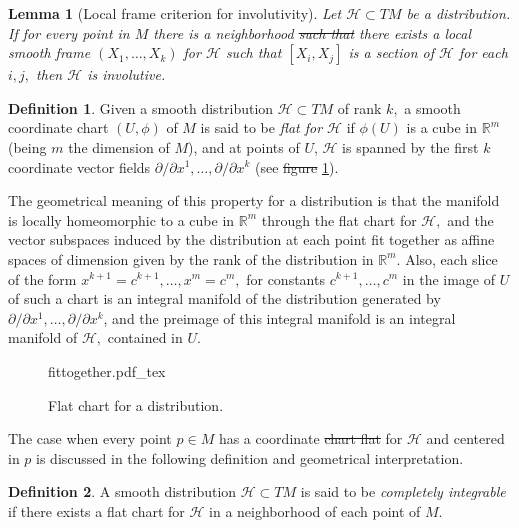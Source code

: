 \documentclass[12pt, letterpaper, reqno]{amsart}
\newcommand{\incfig}[2][1]{%
    \def\svgwidth{#1\columnwidth}
    {#2.pdf_tex}
}
\theoremstyle{definition}
\newtheorem{df}{Definition}
\theoremstyle{plain}
\newtheorem{lm}{Lemma}
\theoremstyle{remark}
\providecommand{\DIFadd}[1]{{\protect\color{blue}\uwave{#1}}} %
\providecommand{\DIFdel}[1]{{\protect\color{red}\sout{#1}}}                      %
\providecommand{\DIFaddbegin}{} %
\providecommand{\DIFaddend}{} %
\providecommand{\DIFdelbegin}{} %
\providecommand{\DIFdelend}{} %
\newcommand{\DIFscaledelfig}{0.5}
\newlength{\DIFdelgraphicswidth} %
\newlength{\DIFdelgraphicsheight} %
\newcommand{\DIFaddincludegraphics}[2][]{{\color{blue}\fbox{\DIFOincludegraphics[#1]{#2}}}} %
\newcommand{\DIFdelincludegraphics}[2][]{%
\sbox{\DIFdelgraphicsbox}{\DIFOincludegraphics[#1]{#2}}%
\settoboxwidth{\DIFdelgraphicswidth}{\DIFdelgraphicsbox} %
\settoboxtotalheight{\DIFdelgraphicsheight}{\DIFdelgraphicsbox} %
\scalebox{\DIFscaledelfig}{%
\parbox[b]{\DIFdelgraphicswidth}{\usebox{\DIFdelgraphicsbox}\\[-\baselineskip] \rule{\DIFdelgraphicswidth}{0em}}\llap{\resizebox{\DIFdelgraphicswidth}{\DIFdelgraphicsheight}{%
\setlength{\unitlength}{\DIFdelgraphicswidth}%
\begin{picture}(1,1)%
\thicklines\linethickness{2pt} %
{\color[rgb]{1,0,0}\put(0,0){\framebox(1,1){}}}%
{\color[rgb]{1,0,0}\put(0,0){\line( 1,1){1}}}%
{\color[rgb]{1,0,0}\put(0,1){\line(1,-1){1}}}%
\end{picture}%
}\hspace*{3pt}}} %
} %
\DeclareRobustCommand{\DIFaddbegin}{\DIFOaddbegin \let\includegraphics\DIFaddincludegraphics} %
\DeclareRobustCommand{\DIFaddend}{\DIFOaddend \let\includegraphics\DIFOincludegraphics} %
\DeclareRobustCommand{\DIFdelbegin}{\DIFOdelbegin \let\includegraphics\DIFdelincludegraphics} %
\DeclareRobustCommand{\DIFdelend}{\DIFOaddend \let\includegraphics\DIFOincludegraphics} %
\begin{document}
\begin{lm}[Local frame criterion for involutivity] 
	Let $ \mathcal{H}\subset TM $ be a distribution. If for every point in $ M $ there is a neighborhood \DIFdelbegin \DIFdel{such that }\DIFdelend \DIFaddbegin \DIFadd{where }\DIFaddend there exists a local smooth frame $ (X_1,\dots, X_k) $ for $ \mathcal{H} $ such that $ [X_i,X_j] $ is a section of $ \mathcal{H} $ for each $ i,j, $ then $ \mathcal{H} $ is involutive.
\end{lm}

\begin{df}
	Given a smooth distribution $ \mathcal{H}\subset TM $  of rank $ k, $ a smooth coordinate chart $ (U,\phi) $ of $ M $ is said to be \textit{flat for $ \mathcal{H} $ } if $ \phi(U) $ is a cube in $ \mathbb{R}^m  $ (being $ m $ the dimension of $ M $), and at points of $ U $, $ \mathcal{H} $ is spanned by the first $ k $ coordinate vector fields $ \partial/\partial x^1,\dots,\partial/\partial x^k $ (see \DIFdelbegin \DIFdel{figure }\DIFdelend \DIFaddbegin \DIFadd{Figure }\DIFaddend \ref{fig:fittogether}).
\end{df}
The geometrical meaning of this property for a distribution is that the manifold is locally homeomorphic to a cube in $ \mathbb{R}^m  $ through the flat chart for $ \mathcal{H}, $  and the vector subspaces induced by the distribution at each point fit together as affine spaces of dimension given by the rank of the distribution in $ \mathbb{R}^m $. Also, each slice of the form $ x^{k+1}=c^{k+1},\dots, x^m=c^m,$ for constants $ c^{k+1}, \dots, c^m $ in the image of $ U $ of such a chart is an integral manifold of the distribution generated by $ \partial/\partial x^1,\dots,\partial/\partial x^k $, and the preimage of this integral manifold is an integral manifold of $ \mathcal{H}, $ contained in $ U. $  

\begin{figure}
    \centering
    \incfig{fittogether}
    \caption{Flat chart for a distribution.}
    \label{fig:fittogether}
\end{figure}

The case when every point $p\in M $ has a coordinate \DIFdelbegin \DIFdel{chart flat }\DIFdelend \DIFaddbegin \DIFadd{flat chart }\DIFaddend for $ \mathcal{H} $ and centered in $ p $ is discussed in the following definition and geometrical interpretation.

\begin{df}
	A smooth distribution $ \mathcal{H}\subset TM $  is said to be \textit{completely integrable} if there exists a flat chart for $ \mathcal{H} $ in a neighborhood of each point of $ M. $ 
\end{df}
\end{document}
